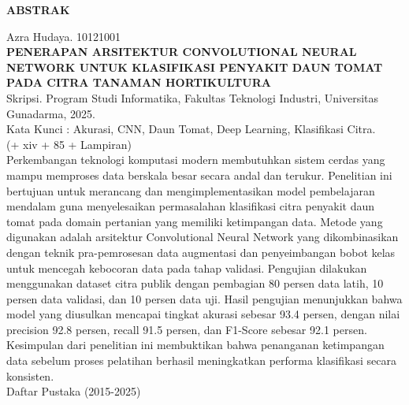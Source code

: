 \documentclass[12pt,a4paper,oneside]{report}
\begin{document}
\begin{singlespace}
\begin{center}
  {\fontsize{14}{16}\bfseries ABSTRAK}\\[0.8cm]
\end{center}

\noindent
Azra Hudaya. 10121001\\
\textbf{PENERAPAN ARSITEKTUR CONVOLUTIONAL NEURAL NETWORK UNTUK KLASIFIKASI PENYAKIT DAUN TOMAT PADA CITRA TANAMAN HORTIKULTURA}\\
Skripsi. Program Studi Informatika, Fakultas Teknologi Industri, Universitas Gunadarma, 2025.\\
Kata Kunci : Akurasi, CNN, Daun Tomat, Deep Learning, Klasifikasi Citra.\\
(+ xiv + 85 + Lampiran)\\[0.5cm]

Perkembangan teknologi komputasi modern membutuhkan sistem cerdas yang mampu memproses data berskala besar secara andal dan terukur. Penelitian ini bertujuan untuk merancang dan mengimplementasikan model pembelajaran mendalam guna menyelesaikan permasalahan klasifikasi citra penyakit daun tomat pada domain pertanian yang memiliki ketimpangan data. Metode yang digunakan adalah arsitektur Convolutional Neural Network yang dikombinasikan dengan teknik pra-pemrosesan data augmentasi dan penyeimbangan bobot kelas untuk mencegah kebocoran data pada tahap validasi. Pengujian dilakukan menggunakan dataset citra publik dengan pembagian 80 persen data latih, 10 persen data validasi, dan 10 persen data uji. Hasil pengujian menunjukkan bahwa model yang diusulkan mencapai tingkat akurasi sebesar 93.4 persen, dengan nilai precision 92.8 persen, recall 91.5 persen, dan F1-Score sebesar 92.1 persen. Kesimpulan dari penelitian ini membuktikan bahwa penanganan ketimpangan data sebelum proses pelatihan berhasil meningkatkan performa klasifikasi secara konsisten.\\[0.8cm]

\noindent
Daftar Pustaka (2015-2025)
\end{singlespace}
\newpage
\end{document}
